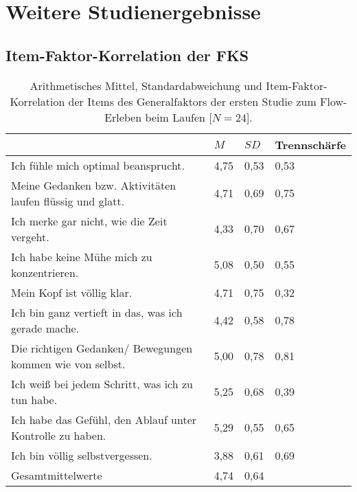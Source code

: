 

\chapter{Weitere Studienergebnisse} 

\label{cha:weitere_studienergebnisse}

\section{Item-Faktor-Korrelation der \ac{FKS}} 

\label{sec:item_faktor_korrelation_der_fks} 
\begin{table}
	[!htb] \centering \caption[Item-Faktor-Korrelation der Items des Generalfaktors (Laufstudie -- intraindividuell).]{Arithmetisches Mittel, Standardabweichung und Item-Faktor-Korrelation der Items des Generalfaktors der ersten Studie zum Flow-Erleben beim Laufen [$N = 24$].} \label{tab:generalfaktor_1} 
	\begin{tabularx}
		{ 
		\textwidth}{p{} p{} p{} p{}} \toprule & $M$ & $SD$ & Trennschärfe \\
		\midrule Ich fühle mich optimal beansprucht. & 4,75 & 0,53 & 0,53 \\
		Meine Gedanken bzw. Aktivitäten laufen flüssig und glatt. & 4,71 & 0,69 & 0,75 \\
		Ich merke gar nicht, wie die Zeit vergeht. & 4,33 & 0,70 & 0,67 \\
		Ich habe keine Mühe mich zu konzentrieren. & 5,08 & 0,50 & 0,55 \\
		Mein Kopf ist völlig klar. & 4,71 & 0,75 & 0,32 \\
		Ich bin ganz vertieft in das, was ich gerade mache. & 4,42 & 0,58 & 0,78 \\
		Die richtigen Gedanken/ Bewegungen kommen wie von selbst. & 5,00 & 0,78 & 0,81 \\
		Ich weiß bei jedem Schritt, was ich zu tun habe. & 5,25 & 0,68 & 0,39 \\
		Ich habe das Gefühl, den Ablauf unter Kontrolle zu haben. & 5,29 & 0,55 & 0,65 \\
		Ich bin völlig selbstvergessen. & 3,88 & 0,61 & 0,69 \\
		Gesamtmittelwerte & 4,74 & 0,64 & \\
		\bottomrule 
	\end{tabularx}
\end{table}
